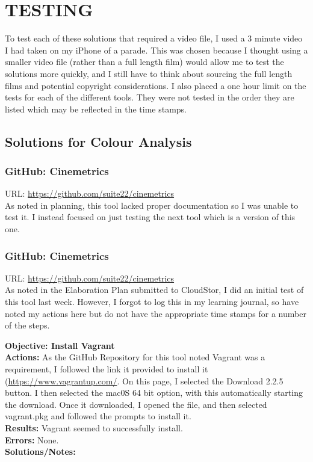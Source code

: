 \documentclass{article}
\begin{document}
\pagebreak

\section{TESTING}

To test each of these solutions that required a video file, I used a 3 minute video I had taken on my iPhone of a parade. This was chosen because I thought using a smaller video file (rather than a full length film) would allow me to test the solutions more quickly, and I still have to think about sourcing the full length films and potential copyright considerations. I also placed a one hour limit on the tests for each of the different tools. They were not tested in the order they are listed which may be reflected in the time stamps.

\subsection{Solutions for Colour Analysis}

\subsubsection{GitHub: Cinemetrics}
URL: \url{https://github.com/suite22/cinemetrics}\\
As noted in planning, this tool lacked proper documentation so I was unable to test it. I instead focused on just testing the next tool which is a version of this one.

\subsubsection{GitHub: Cinemetrics}
URL: \url{https://github.com/suite22/cinemetrics}\\

As noted in the Elaboration Plan submitted to CloudStor, I did an initial test of this tool last week. However, I forgot to log this in my learning journal, so have noted my actions here but do not have the appropriate time stamps for a number of the steps.

\textbf{Objective: Install Vagrant}\\
\textbf{Actions:} As the GitHub Repository for this tool noted Vagrant was a requirement, I followed the link it provided to install it (\url{https://www.vagrantup.com/}. On this page, I selected the Download 2.2.5 button. I then selected the mac0S 64 bit option, with this automatically starting the download. Once it downloaded, I opened the file, and then selected vagrant.pkg and followed the prompts to install it.  \\
\textbf{Results:} Vagrant seemed to successfully install.\\
\textbf{Errors:} None.\\
\textbf{Solutions/Notes:}\\
\end{document}
